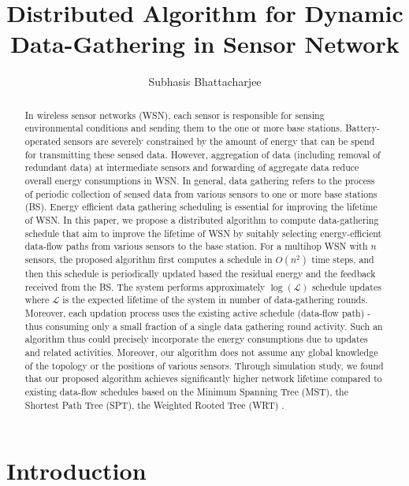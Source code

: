 \documentclass[10pt]{llncs}
\title{Distributed Algorithm for Dynamic Data-Gathering in Sensor Network}
\author{Subhasis Bhattacharjee}
\institute{University of Bristol\\
Merchant Venturers Building\\
Bristol, BS8 1UB\\
\email{subhasis18@gmail.com}}
\begin{document}
\maketitle

\begin{abstract}

In wireless sensor networks (WSN), each sensor is responsible for sensing environmental conditions and sending them to the one or more base stations. Battery-operated sensors are severely constrained by the amount of energy that can be spend for transmitting these sensed data. However, aggregation of data (including removal of redundant data) at intermediate sensors and forwarding of aggregate data reduce overall energy consumptions in WSN. In general, data gathering refers to the process of periodic collection of sensed data from various sensors to one or more base stations (BS). Energy efficient data gathering scheduling is essential for improving the lifetime of WSN. In this paper, we propose a distributed algorithm to compute data-gathering schedule that aim to improve the lifetime of WSN by suitably selecting energy-efficient data-flow paths from various sensors to the base station. For a multihop WSN with $n$ sensors, the proposed algorithm first computes a schedule in $O(n^2)$ time steps, and then this schedule is periodically updated based the residual energy and the feedback received from the BS. The system performs approximately $\log(\mathcal{L})$ schedule updates where $\mathcal{L}$ is the expected lifetime of the system in number of data-gathering rounds. Moreover, each updation process uses the existing active schedule (data-flow path) - thus consuming only a small fraction of a single data gathering round activity. Such an algorithm thus could precisely incorporate the energy consumptions due to updates and related activities. Moreover, our algorithm does not assume any global knowledge of the topology or the positions of various sensors. Through simulation study, we found that our proposed algorithm achieves significantly higher network lifetime compared to existing data-flow schedules based on the Minimum Spanning Tree (MST), the Shortest Path Tree (SPT), the Weighted Rooted Tree (WRT) \cite{Bhattacharjee07}.
\end{abstract}

\section{Introduction}
\end{document}
